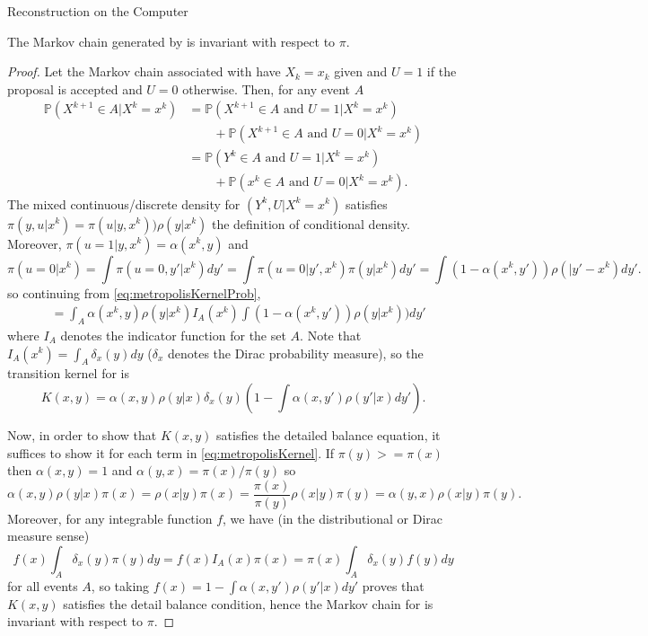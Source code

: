 \begin{chapter}{Reconstruction on the Computer}
\begin{prop} \label{prop:metropolisInvariance}
  The Markov chain generated by  is invariant with respect to $\pi$.
\end{prop}
\begin{proof}
Let the Markov chain associated with  have $X_k=x_k$ given and $U=1$ if the proposal is accepted and $U=0$ otherwise. 
Then, for any event $A$ 
\begin{align}
  \mathbb P\left( X^{k+1} \in A | X^k = x^k \right)
    &= \mathbb P\left( X^{k+1} \in A\text{ and } U = 1 |X^k=x^k \right) \nonumber\\
    &\quad\quad+ \mathbb P\left(X^{k+1} \in A\text{ and } U = 0| X^k=x^k \right) \nonumber \\
    &= \mathbb P\left( Y^k \in A\text{ and } U = 1 |X^k=x^k \right) \nonumber\\
    &\quad\quad+ \mathbb P\left(x^k \in A\text{ and } U = 0| X^k=x^k \right). \label{eq:metropolisKernelProb}
\end{align}
The mixed continuous/discrete density for $(Y^k,U|X^k = x^k)$ satisfies $\pi(y,u|x^k) = \pi(u|y,x^k))\rho(y|x^k)$ the definition of conditional density.  
Moreover, $\pi(u=1|y,x^k) = \alpha(x^k,y)$ 
and 
\begin{equation*}
  \pi(u=0|x^k) = \int \pi(u=0,y'|x^k)dy' = \int \pi(u=0|y',x^k)\pi(y|x^k)dy' = \int (1-\alpha(x^k,y'))\rho(|y'-x^k)dy'.
\end{equation*}
so continuing from \eqref{eq:metropolisKernelProb},
\begin{align}
    &= \int_A \alpha(x^k,y)\rho(y|x^k) I_A(x^k) \int (1 - \alpha(x^k,y'))\rho(y|x^k))dy'
\end{align}
where $I_A$ denotes the indicator function for the set $A$.
Note that $I_A(x^k) = \int_A \delta_x(y)dy$ ($\delta_x$ denotes the Dirac probability measure), so the transition kernel for  is
\begin{equation} \label{eq:metropolisKernel}
  K(x,y) = \alpha(x,y)\rho(y|x) \delta_x(y) \left(1 - \int \alpha(x,y')\rho(y'|x)dy'\right).
\end{equation}

Now, in order to show that $K(x,y)$ satisfies the detailed balance equation, it suffices to show it for each term in \eqref{eq:metropolisKernel}.
If $\pi(y) >= \pi(x)$ then $\alpha(x,y) = 1$ and $\alpha(y,x) = \pi(x)/\pi(y)$ so 
\begin{equation}
  \alpha(x,y)\rho(y|x)\pi(x) = \rho(x|y)\pi(x) = \frac{\pi(x)}{\pi(y)}\rho(x|y)\pi(y) = \alpha(y,x)\rho(x|y)\pi(y).
\end{equation}
Moreover, for any integrable function $f$, we have (in the distributional or Dirac measure sense)
\begin{equation}
  f(x)\int_A \delta_x(y) \pi(y)dy = f(x)I_A(x)\pi(x) = \pi(x)\int_A \delta_x(y) f(y)dy
\end{equation}
for all events $A$, so taking $f(x) = 1 - \int\alpha(x,y')\rho(y'|x)dy'$ proves that $K(x,y)$ satisfies the detail balance condition, hence the Markov chain for  is invariant with respect to $\pi$.
\end{proof}


\end{chapter}
